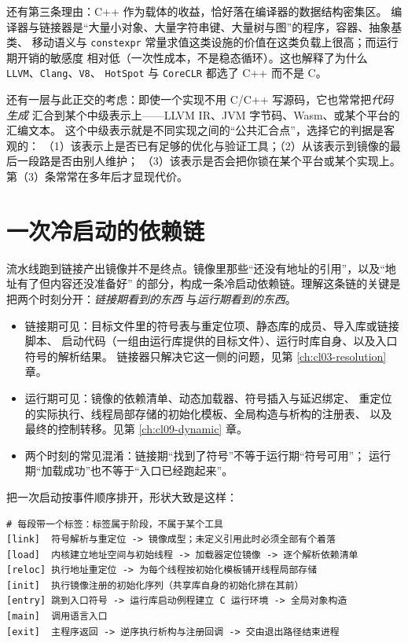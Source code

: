 \documentclass[12pt,a4paper,fontset=fandol]{ctexbook}
\newcommand{\Tp}[1]{\texttt{#1}}
\newcommand{\Lang}[1]{\textsf{#1}}
\newcommand{\CL}{\Lang{C}}
\newcommand{\CPP}{\Lang{C++}}
\newcommand{\Tool}[1]{\texttt{#1}}
\newcommand{\Mx}[1]{\textsf{#1}}
\begin{document}
还有第三条理由：\CPP{} 作为载体的收益，恰好落在编译器的数据结构密集区。
编译器与链接器是“大量小对象、大量字符串键、大量树与图”的程序，容器、抽象基类、
移动语义与 \Tp{constexpr} 常量求值这类设施的价值在这类负载上很高；而运行期开销的敏感度
相对低（一次性成本，不是稳态循环）。这也解释了为什么 \Tool{LLVM}、\Tool{Clang}、\Tool{V8}、
\Tool{HotSpot} 与 \Tool{CoreCLR} 都选了 \CPP{} 而不是 \CL{}。

还有一层与此正交的考虑：即使一个实现不用 \CL{}/\CPP{} 写源码，它也常常把\emph{代码生成}
汇合到某个中级表示上——LLVM IR、\Lang{JVM} 字节码、\Mx{Wasm}、或某个平台的汇编文本。
这个中级表示就是不同实现之间的“公共汇合点”，选择它的判据是客观的：
（1）该表示上是否已有足够的优化与验证工具；（2）从该表示到镜像的最后一段路是否由别人维护；
（3）该表示是否会把你锁在某个平台或某个实现上。第（3）条常常在多年后才显现代价。

\section{一次冷启动的依赖链}\label{sec:cl01-coldstart}

流水线跑到链接产出镜像并不是终点。镜像里那些“还没有地址的引用”，以及“地址有了但内容还没准备好”
的部分，构成一条冷启动依赖链。理解这条链的关键是把两个时刻分开：\emph{链接期看到的东西}
与\emph{运行期看到的东西}。

\begin{abibox}[title={链接期可见与运行期可见，两回事}]
\begin{itemize}
  \item 链接期可见：目标文件里的符号表与重定位项、静态库的成员、导入库或链接脚本、
    启动代码（一组由运行库提供的目标文件）、运行时库自身、以及入口符号的解析结果。
    链接器只解决它这一侧的问题，见第 \ref{ch:cl03-resolution} 章。
  \item 运行期可见：镜像的依赖清单、动态加载器、符号插入与延迟绑定、
    重定位的实际执行、线程局部存储的初始化模板、全局构造与析构的注册表、
    以及最终的控制转移。见第 \ref{ch:cl09-dynamic} 章。
  \item 两个时刻的常见混淆：链接期“找到了符号”不等于运行期“符号可用”；
    运行期“加载成功”也不等于“入口已经跑起来”。
\end{itemize}
\end{abibox}

把一次启动按事件顺序排开，形状大致是这样：

\begin{lstlisting}[style=outstyle,caption={一次冷启动的事件顺序（示意描述，非真实工具输出，不含实测数据）}]
# 每段带一个标签：标签属于阶段，不属于某个工具
[link]  符号解析与重定位 -> 镜像成型；未定义引用此时必须全部有个着落
[load]  内核建立地址空间与初始线程 -> 加载器定位镜像 -> 逐个解析依赖清单
[reloc] 执行地址重定位 -> 为每个线程按初始化模板铺开线程局部存储
[init]  执行镜像注册的初始化序列（共享库自身的初始化排在其前）
[entry] 跳到入口符号 -> 运行库启动例程建立 C 运行环境 -> 全局对象构造
[main]  调用语言入口
[exit]  主程序返回 -> 逆序执行析构与注册回调 -> 交由退出路径结束进程
\end{lstlisting}
\end{document}
